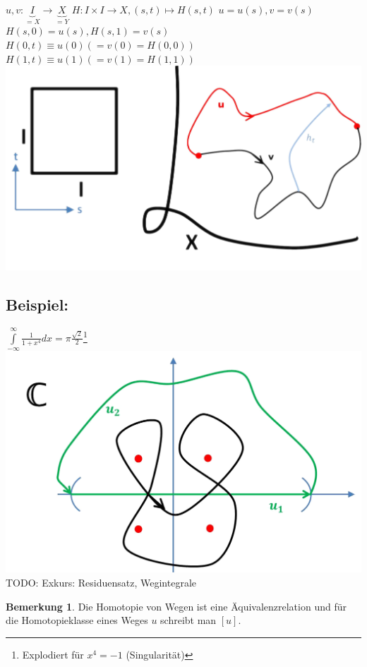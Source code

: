 \documentclass[a4paper,11pt,notitlepage]{report}
\theoremstyle{definition}
\newtheorem{remark}{Bemerkung}[chapter]
\newenvironment{bsp}[1]
{
\setlength{\fboxsep}{10pt}
\subsection*{Beispiel: #1}
\begin{upshape}
}
{
\end{upshape}
}
\begin{document}
$u,v \colon \underbrace{I}_{= X} \rightarrow \underbrace{X}_{=Y}$ \newline
$H \colon I \times I \rightarrow X, (s,t) \mapsto H(s,t)$ \newline
$u = u(s), v= v(s)$ \newline
$H(s,0) = u(s), H(s,1)=v(s)$ \newline
$H(0,t) \equiv u(0) (=v(0) = H(0,0))$ \newline
$H(1,t) \equiv u(1) (=v(1) = H(1,1))$ \newline
\includegraphics[scale=0.4]{images/Homotopie_Menge_von_Wegen.png}

\begin{bsp}{}
	$\int\limits_{-\infty}^{\infty}{\frac{1}{1+x^4} dx} = \pi \frac{\sqrt{2}}{2}$\footnote{Explodiert für $x^4 = -1$ (Singularität)}
	\includegraphics[scale=0.4]{images/Residuensatz.png}
	\newline
	TODO: Exkurs: Residuensatz, Wegintegrale
\end{bsp}

\begin{remark}{}
	Die Homotopie von Wegen ist eine Äquivalenzrelation und für die Homotopieklasse eines Weges $u$ schreibt man $[u]$.
\end{remark}
\end{document}
